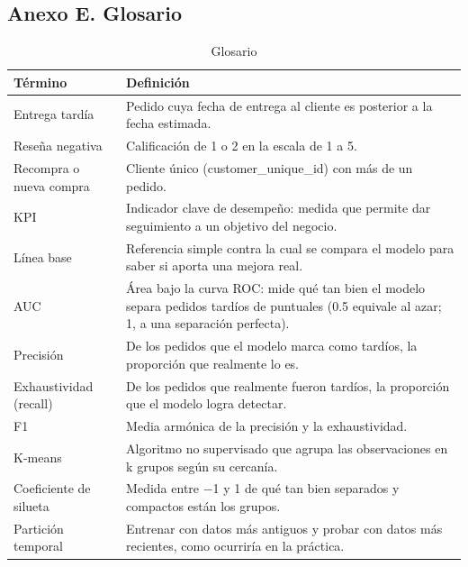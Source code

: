 \documentclass[a4paper,stu,12pt,donotrepeattitle,floatsintext]{apa7}
\begin{document}
\subsection{Anexo E. Glosario}
{\footnotesize
\begin{longtable}{|>{\raggedright\arraybackslash}p{}|>{\raggedright\arraybackslash}p{}|}
\caption{Glosario}\\
\hline
\textbf{Término} & \textbf{Definición} \\ \hline
\endhead
Entrega tardía & Pedido cuya fecha de entrega al cliente es posterior a la fecha estimada. \\ \hline
Reseña negativa & Calificación de 1 o 2 en la escala de 1 a 5. \\ \hline
Recompra o nueva compra & Cliente único (customer\_\allowbreak{}unique\_\allowbreak{}id) con más de un pedido. \\ \hline
KPI & Indicador clave de desempeño: medida que permite dar seguimiento a un objetivo del negocio. \\ \hline
Línea base & Referencia simple contra la cual se compara el modelo para saber si aporta una mejora real. \\ \hline
AUC & Área bajo la curva ROC: mide qué tan bien el modelo separa pedidos tardíos de puntuales (0.5 equivale al azar; 1, a una separación perfecta). \\ \hline
Precisión & De los pedidos que el modelo marca como tardíos, la proporción que realmente lo es. \\ \hline
Exhaustividad (recall) & De los pedidos que realmente fueron tardíos, la proporción que el modelo logra detectar. \\ \hline
F1 & Media armónica de la precisión y la exhaustividad. \\ \hline
K-means & Algoritmo no supervisado que agrupa las observaciones en k grupos según su cercanía. \\ \hline
Coeficiente de silueta & Medida entre $-$1 y 1 de qué tan bien separados y compactos están los grupos. \\ \hline
Partición temporal & Entrenar con datos más antiguos y probar con datos más recientes, como ocurriría en la práctica. \\ \hline
\end{longtable}
}
\end{document}
